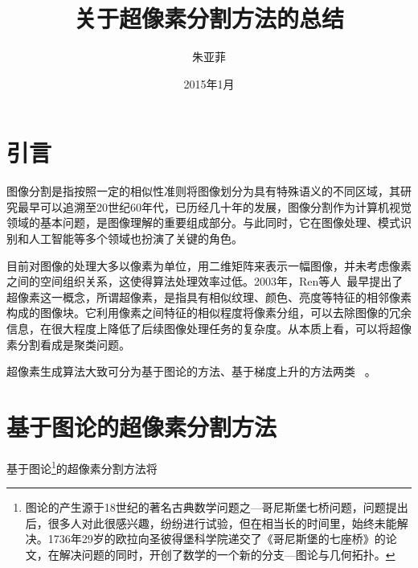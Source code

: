 \documentclass[12pt]{article}
\begin{document}
\title{\vspace{-2em}关于超像素分割方法的总结\vspace{-0.7em}}
\author{朱亚菲}
\date{\vspace{-0.7em}2015年1月\vspace{-0.7em}}
\maketitle\thispagestyle{fancy}
\maketitle
\tableofcontents 


\section{引言}

图像分割是指按照一定的相似性准则将图像划分为具有特殊语义的不同区域，其研究最早可以追溯至20世纪60年代，已历经几十年的发展，图像分割作为计算机视觉领域的基本问题，是图像理解的重要组成部分。与此同时，它在图像处理、模式识别和人工智能等多个领域也扮演了关键的角色。

目前对图像的处理大多以像素为单位，用二维矩阵来表示一幅图像，并未考虑像素之间的空间组织关系，这使得算法处理效率过低。2003年，Ren等人~\cite{ren2003learning}最早提出了超像素这一概念，所谓超像素，是指具有相似纹理、颜色、亮度等特征的相邻像素构成的图像块。它利用像素之间特征的相似程度将像素分组，可以去除图像的冗余信息，在很大程度上降低了后续图像处理任务的复杂度。从本质上看，可以将超像素分割看成是聚类问题。

超像素生成算法大致可分为基于图论的方法、基于梯度上升的方法两类~\cite{achanta2012slic} 。

\section{基于图论的超像素分割方法}

基于图论\footnote{图论的产生源于18世纪的著名古典数学问题之---哥尼斯堡七桥问题，问题提出后，很多人对此很感兴趣，纷纷进行试验，但在相当长的时间里，始终未能解决。1736年29岁的欧拉向圣彼得堡科学院递交了《哥尼斯堡的七座桥》的论文，在解决问题的同时，开创了数学的一个新的分支---图论与几何拓扑。}的超像素分割方法将
\end{document}
